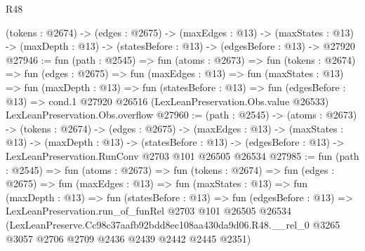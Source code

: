 \begin{lexlean}{R48}
\begin{coremodule}
  (tokens : @2674) ->
  (edges : @2675) ->
  (maxEdges : @13) ->
  (maxStates : @13) -> (maxDepth : @13) -> (statesBefore : @13) -> (edgesBefore : @13) -> @27920
@27946 := fun (path : @2545) =>
  fun (atoms : @2673) =>
  fun (tokens : @2674) =>
  fun (edges : @2675) =>
  fun (maxEdges : @13) =>
  fun (maxStates : @13) =>
  fun (maxDepth : @13) =>
  fun (statesBefore : @13) =>
  fun (edgesBefore : @13) =>
  cond.{1} @27920 @26516 (LexLeanPreservation.Obs.value @26533) LexLeanPreservation.Obs.overflow
@27960 := (path : @2545) ->
  (atoms : @2673) ->
  (tokens : @2674) ->
  (edges : @2675) ->
  (maxEdges : @13) ->
  (maxStates : @13) ->
  (maxDepth : @13) ->
  (statesBefore : @13) ->
  (edgesBefore : @13) -> LexLeanPreservation.RunConv @2703 @101 @26505 @26534
@27985 := fun (path : @2545) =>
  fun (atoms : @2673) =>
  fun (tokens : @2674) =>
  fun (edges : @2675) =>
  fun (maxEdges : @13) =>
  fun (maxStates : @13) =>
  fun (maxDepth : @13) =>
  fun (statesBefore : @13) =>
  fun (edgesBefore : @13) =>
  LexLeanPreservation.run_of_funRel
    @2703
    @101
    @26505
    @26534
    (LexLeanPreserve.Cc98c37aafb92bdd8ec108aa430da9d06.R48.__rel_0
      @3265
      @3057
      @2706
      @2709
      @2436
      @2439
      @2442
      @2445
      @2351)
\end{coremodule}
\end{lexlean}
